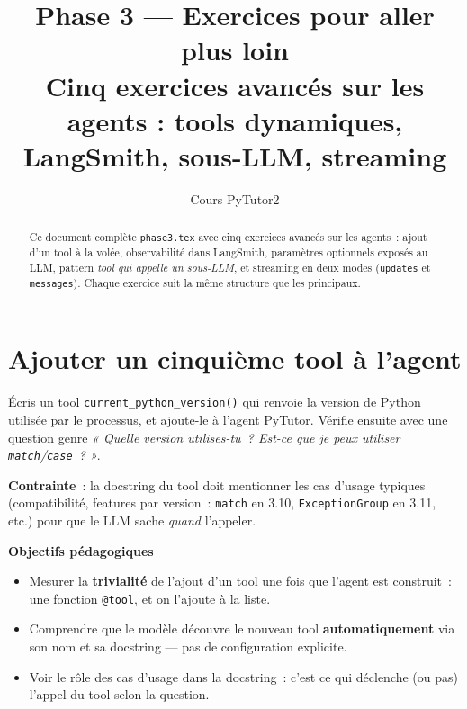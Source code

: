 \documentclass[11pt,a4paper]{article}
\title{\textbf{Phase 3 — Exercices pour aller plus loin}\\
\large Cinq exercices avancés sur les agents : tools dynamiques, LangSmith, sous-LLM, streaming}
\author{Cours PyTutor2}
\date{}
\begin{document}
\maketitle

\begin{abstract}
\noindent
Ce document complète \texttt{phase3.tex} avec cinq exercices avancés
sur les agents~: ajout d'un tool à la volée, observabilité dans LangSmith,
paramètres optionnels exposés au LLM, pattern \emph{tool qui appelle un
sous-LLM}, et streaming en deux modes (\texttt{updates} et
\texttt{messages}). Chaque exercice suit la même structure que les
principaux.
\end{abstract}

\tableofcontents
\bigskip

\section{Ajouter un cinquième tool à l'agent}

\begin{tcolorbox}[title=Exercice bonus 1. Étendre l'inventaire de tools en une fonction]
Écris un tool \texttt{current\_python\_version()} qui renvoie la version
de Python utilisée par le processus, et ajoute-le à l'agent PyTutor.
Vérifie ensuite avec une question genre \emph{« Quelle version utilises-tu~?
Est-ce que je peux utiliser \texttt{match}/\texttt{case}~? »}.

\textbf{Contrainte}~: la docstring du tool doit mentionner les cas
d'usage typiques (compatibilité, features par version~: \texttt{match} en
3.10, \texttt{ExceptionGroup} en 3.11, etc.) pour que le LLM sache
\emph{quand} l'appeler.

\bigskip
\noindent\textbf{Objectifs pédagogiques}
\begin{itemize}[leftmargin=*]
  \item Mesurer la \textbf{trivialité} de l'ajout d'un tool une fois
        que l'agent est construit~: une fonction \texttt{@tool}, et
        on l'ajoute à la liste.
  \item Comprendre que le modèle découvre le nouveau tool
        \textbf{automatiquement} via son nom et sa docstring — pas de
        configuration explicite.
  \item Voir le rôle des cas d'usage dans la docstring~: c'est ce qui
        déclenche (ou pas) l'appel du tool selon la question.
\end{itemize}
\end{tcolorbox}
\end{document}
